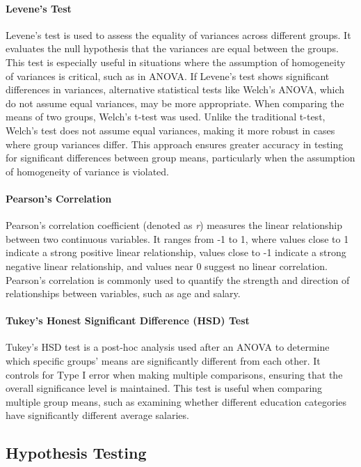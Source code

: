 \paragraph{Levene's Test}
Levene’s test is used to assess the equality of variances across different groups. It evaluates the null hypothesis that the variances are equal between the groups. This test is especially useful in situations where the assumption of homogeneity of variances is critical, such as in ANOVA. If Levene’s test shows significant differences in variances, alternative statistical tests like Welch’s ANOVA, which do not assume equal variances, may be more appropriate. When comparing the means of two groups, Welch’s t-test was used. Unlike the traditional t-test, Welch’s test does not assume equal variances, making it more robust in cases where group variances differ. This approach ensures greater accuracy in testing for significant differences between group means, particularly when the assumption of homogeneity of variance is violated.

\paragraph{Pearson’s Correlation}
Pearson's correlation coefficient (denoted as \textit{r}) measures the linear relationship between two continuous variables. It ranges from -1 to 1, where values close to 1 indicate a strong positive linear relationship, values close to -1 indicate a strong negative linear relationship, and values near 0 suggest no linear correlation. Pearson's correlation is commonly used to quantify the strength and direction of relationships between variables, such as age and salary.

\paragraph{Tukey’s Honest Significant Difference (HSD) Test}
Tukey’s HSD test is a post-hoc analysis used after an ANOVA to determine which specific groups' means are significantly different from each other. It controls for Type I error when making multiple comparisons, ensuring that the overall significance level is maintained. This test is useful when comparing multiple group means, such as examining whether different education categories have significantly different average salaries.

\subsection{Hypothesis Testing}







